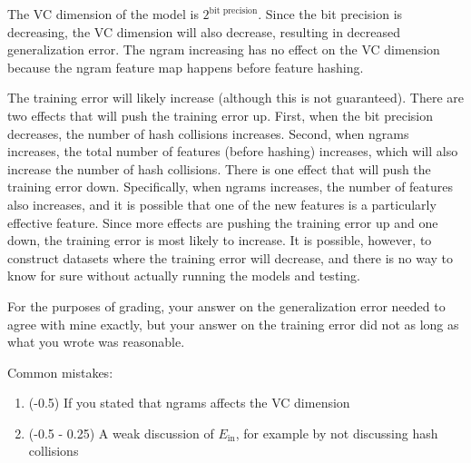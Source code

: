 \documentclass[10pt]{exam}
\theoremstyle{definition}
\newcommand{\Ein}{E_{\text{in}}}
\begin{document}
\begin{solution}
    The VC dimension of the model is $2^{\text{bit precision}}$.
    Since the bit precision is decreasing,
    the VC dimension will also decrease,
    resulting in decreased generalization error.
    The ngram increasing has no effect on the VC dimension because the ngram feature map happens before feature hashing.

    The training error will likely increase (although this is not guaranteed).
    There are two effects that will push the training error up.
    First, when the bit precision decreases, the number of hash collisions increases.
    Second, when ngrams increases, the total number of features (before hashing) increases, which will also increase the number of hash  collisions.
    There is one effect that will push the training error down.
    Specifically, when ngrams increases, the number of features also increases, and it is possible that one of the new features is a particularly effective feature.
    Since more effects are pushing the training error up and one down,
    the training error is most likely to increase.
    It is possible, however, to construct datasets where the training error will decrease, and there is no way to know for sure without actually running the models and testing.

    For the purposes of grading, your answer on the generalization error needed to agree with mine exactly, but your answer on the training error did not as long as what you wrote was reasonable.
%

Common mistakes:
\begin{enumerate}
    \item (-0.5) If you stated that ngrams affects the VC dimension
    \item (-0.5 - 0.25) A weak discussion of $\Ein$, for example by not discussing hash collisions
\end{enumerate}
\end{solution}
\end{document}
